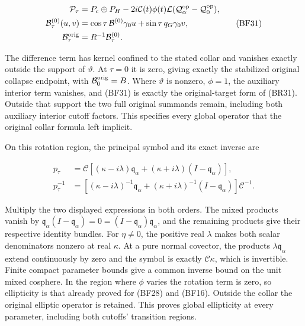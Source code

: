 \documentclass[
  11pt,
]{article}
\begin{document}
\[
 \begin{split}
 \mathcal P_\tau
 &=P_{\mathrm c}\oplus P_H
   -2i\mathcal C(t)\phi(t)\mathcal L
                  (\mathcal Q_\alpha^{\rm op}-\mathcal Q_0^{\rm op}),\\
 \mathcal B_\tau^{(0)}(u,v)
 &=\cos\tau\,\mathcal B^{(0)}\gamma_0u
                      +\sin\tau\,q_G\gamma_0v,\\
 \mathcal B_\tau^{\rm orig}&=R^{-1}\mathcal B_\tau^{(0)}.
 \end{split}
 \tag{BF31}
\]

The difference term has kernel confined to the stated collar and
vanishes exactly outside the support of \(\vartheta\). At \(\tau=0\) it
is zero, giving exactly the stabilized original collapse endpoint, with
\(\mathcal B_0^{\rm orig}=B\). Where \(\vartheta\) is nonzero,
\(\phi=1\), the auxiliary interior term vanishes, and (BF31) is exactly
the original-target form of (BR31). Outside that support the two full
original summands remain, including both auxiliary interior cutoff
factors. This specifies every global operator that the original collar
formula left implicit.

On this rotation region, the principal symbol and its exact inverse are

\[
 \begin{split}
 p_\tau&=\mathcal C\left[
      (\kappa-i\lambda)\mathfrak q_\alpha
       +(\kappa+i\lambda)(I-\mathfrak q_\alpha)\right],\\
 p_\tau^{-1}&=\left[
      (\kappa-i\lambda)^{-1}\mathfrak q_\alpha
       +(\kappa+i\lambda)^{-1}(I-\mathfrak q_\alpha)\right]
       \mathcal C^{-1}.
 \end{split}
 \tag{BF32}
\]

Multiply the two displayed expressions in both orders. The mixed
products vanish by
\(\mathfrak q_\alpha(I-\mathfrak q_\alpha)=0=(I-\mathfrak q_\alpha)\mathfrak q_\alpha\),
and the remaining products give their respective identity bundles. For
\(\eta\ne0\), the positive real \(\lambda\) makes both scalar
denominators nonzero at real \(\kappa\). At a pure normal covector, the
products \(\lambda\mathfrak q_\alpha\) extend continuously by zero and
the symbol is exactly \(\mathcal C\kappa\), which is invertible. Finite
compact parameter bounds give a common inverse bound on the unit mixed
cosphere. In the region where \(\phi\) varies the rotation term is zero,
so ellipticity is that already proved for (BF28) and (BF16). Outside the
collar the original elliptic operator is retained. This proves global
ellipticity at every parameter, including both cutoffs' transition
regions.
\end{document}
